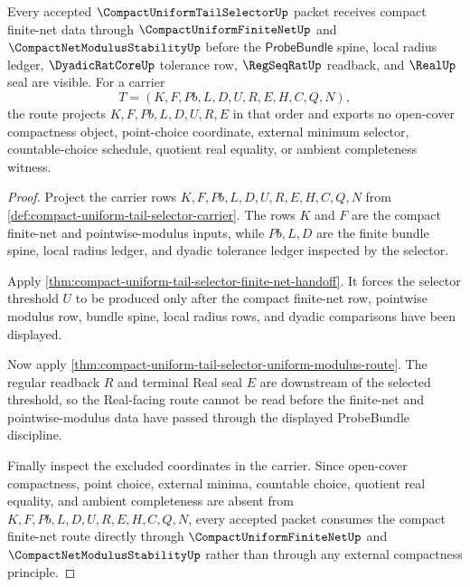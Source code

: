 \begin{theorem}
\label{thm:compact-uniform-tail-selector-finite-net-route}
Every accepted $\CompactUniformTailSelectorUp$ packet receives compact finite-net data through $\CompactUniformFiniteNetUp$ and $\CompactNetModulusStabilityUp$ before the $\mathsf{ProbeBundle}$ spine, local radius ledger, $\DyadicRatCoreUp$ tolerance row, $\RegSeqRatUp$ readback, and $\RealUp$ seal are visible. For a carrier
$$
T=(K,F,Pb,L,D,U,R,E,H,C,Q,N),
$$
the route projects $K,F,Pb,L,D,U,R,E$ in that order and exports no open-cover compactness object, point-choice coordinate, external minimum selector, countable-choice schedule, quotient real equality, or ambient completeness witness.
\end{theorem}
\begin{proof}
Project the carrier rows $K,F,Pb,L,D,U,R,E,H,C,Q,N$ from \autoref{def:compact-uniform-tail-selector-carrier}. The rows $K$ and $F$ are the compact finite-net and pointwise-modulus inputs, while $Pb,L,D$ are the finite bundle spine, local radius ledger, and dyadic tolerance ledger inspected by the selector.

Apply \autoref{thm:compact-uniform-tail-selector-finite-net-handoff}. It forces the selector threshold $U$ to be produced only after the compact finite-net row, pointwise modulus row, bundle spine, local radius rows, and dyadic comparisons have been displayed.

Now apply \autoref{thm:compact-uniform-tail-selector-uniform-modulus-route}. The regular readback $R$ and terminal Real seal $E$ are downstream of the selected threshold, so the Real-facing route cannot be read before the finite-net and pointwise-modulus data have passed through the displayed ProbeBundle discipline.

Finally inspect the excluded coordinates in the carrier. Since open-cover compactness, point choice, external minima, countable choice, quotient real equality, and ambient completeness are absent from $K,F,Pb,L,D,U,R,E,H,C,Q,N$, every accepted packet consumes the compact finite-net route directly through $\CompactUniformFiniteNetUp$ and $\CompactNetModulusStabilityUp$ rather than through any external compactness principle.
\end{proof}


